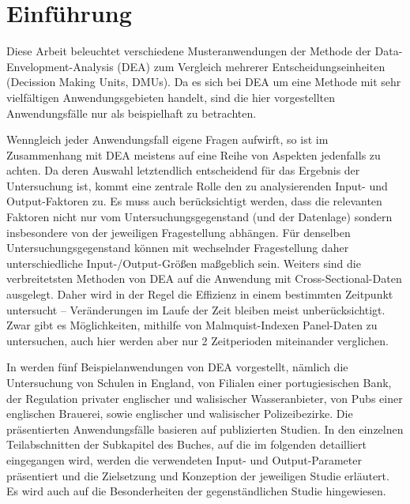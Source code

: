 \section{Einführung}

Diese Arbeit beleuchtet verschiedene Musteranwendungen der Methode der Data-Envelopment-Analysis (DEA) zum Vergleich mehrerer Entscheidungseinheiten (Decission Making Units, DMUs).
Da es sich bei DEA um eine Methode mit sehr vielfältigen Anwendungsgebieten handelt, sind die hier vorgestellten Anwendungsfälle nur als beispielhaft zu betrachten.

Wenngleich jeder Anwendungsfall eigene Fragen aufwirft, so ist im Zusammenhang mit DEA meistens auf eine Reihe von Aspekten jedenfalls zu achten.
Da deren Auswahl letztendlich entscheidend für das Ergebnis der Untersuchung ist, kommt eine zentrale Rolle den zu analysierenden Input- und Output-Faktoren zu.
Es muss auch berücksichtigt werden, dass die relevanten Faktoren nicht nur vom Untersuchungsgegenstand (und der Datenlage) sondern insbesondere von der jeweiligen Fragestellung abhängen.
Für denselben Untersuchungsgegenstand können mit wechselnder Fragestellung daher unterschiedliche Input-/Output-Größen maßgeblich sein.
Weiters sind die verbreitetsten Methoden von DEA auf die Anwendung mit Cross-Sectional-Daten ausgelegt.
Daher wird in der Regel die Effizienz in einem bestimmten Zeitpunkt untersucht -- Veränderungen im Laufe der Zeit bleiben meist unberücksichtigt.
Zwar gibt es Möglichkeiten, mithilfe von Malmquist-Indexen Panel-Daten zu untersuchen, auch hier werden aber nur 2 Zeitperioden miteinander verglichen.

In \cite*[Abschnitt 3.10 "`Sample Applications"')]{fried_measurement_2008} werden fünf Beispielanwendungen von DEA vorgestellt, nämlich die Untersuchung von Schulen in England, von Filialen einer portugiesischen Bank, der Regulation privater englischer und walisischer Wasseranbieter, von Pubs einer englischen Brauerei, sowie englischer und walisischer Polizeibezirke.
Die präsentierten Anwendungsfälle basieren auf publizierten Studien.
In den einzelnen Teilabschnitten der Subkapitel des Buches, auf die im folgenden detailliert eingegangen wird, werden die verwendeten Input- und Output-Parameter präsentiert und die Zielsetzung und Konzeption der jeweiligen Studie erläutert.
Es wird auch auf die Besonderheiten der gegenständlichen Studie hingewiesen.